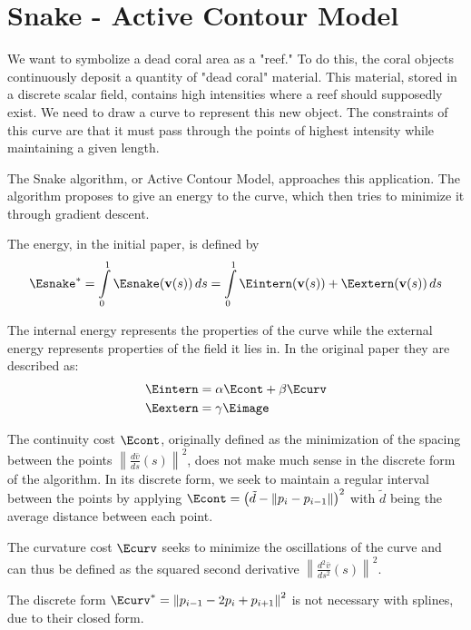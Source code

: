 \chapter{Snake - Active Contour Model}

We want to symbolize a dead coral area as a  "reef." To do this, the coral objects continuously deposit a quantity of "dead coral" material. This material, stored in a discrete scalar field, contains high intensities where a reef should supposedly exist. 
We need to draw a curve to represent this new object. The constraints of this curve are that it must pass through the points of highest intensity while maintaining a given length.

The Snake algorithm, or Active Contour Model, approaches this application. The algorithm proposes to give an energy to the curve, which then tries to minimize it through gradient descent.

The energy, in the initial paper, is defined by
\begin{align}
    \Esnake^{*} = \int \limits _{0}^{1} { \Esnake(\mathbf {v} (s))\,ds } = \int \limits _{0}^{1} { \Eintern (\mathbf {v} (s)) + \Eextern (\mathbf {v} (s)) } \,ds
\end{align}

The internal energy represents the properties of the curve while the external energy represents properties of the field it lies in. In the original paper they are described as: 
\begin{align}
    \Eintern &= \alpha \Econt + \beta \Ecurv \\
    \Eextern &= \gamma \Eimage
\end{align}

The continuity cost $\Econt$, originally defined as the minimization of the spacing between the points $\left\|{\frac {d{\bar {v}}}{ds}}(s)\right\| ^{2}$, does not make much sense in the discrete form of the algorithm. In its discrete form, we seek to maintain a regular interval between the points by applying $\Econt = \left(\tilde{d} - \left\|p_i - p_{i-1} \right\| \right)^2$ with $\tilde{d}$ being the average distance between each point.

The curvature cost $\Ecurv$ seeks to minimize the oscillations of the curve and can thus be defined as the squared second derivative $\left\|{\frac {d^{2}{\bar {v}}}{ds^{2}}}(s)\right\| ^{2}$.

The discrete form $\Ecurv^{*} = \left\| p_{i-1} - 2 p_i + p_{i+1} \right\| ^2$ is not necessary with splines, due to their closed form.

